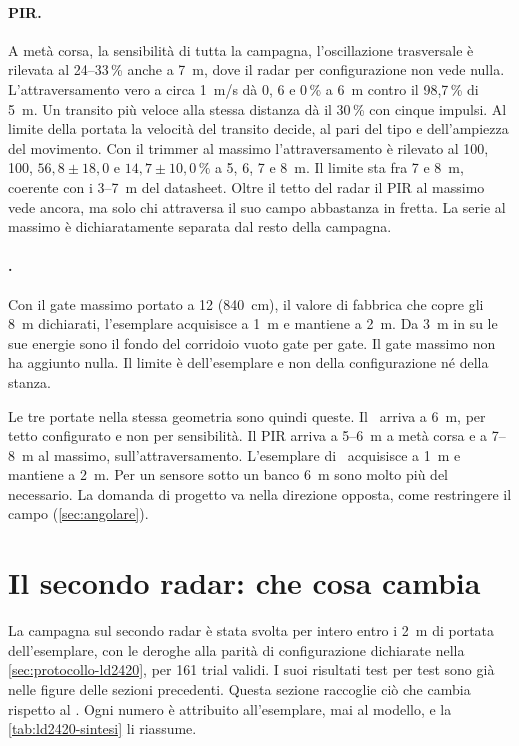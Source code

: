 \paragraph{PIR.} A metà corsa, la sensibilità di tutta la campagna, l'oscillazione
trasversale è rilevata al 24--33\,\% anche a 7~m, dove il radar per configurazione non
vede nulla. L'attraversamento vero a circa 1~m/s dà 0, 6 e 0\,\% a 6~m contro il
98,7\,\% di 5~m. Un transito più veloce alla stessa distanza dà il 30\,\% con cinque
impulsi. Al limite della portata la velocità del transito decide, al pari del tipo e
dell'ampiezza del movimento. Con il trimmer al massimo l'attraversamento è rilevato al
100, 100, $56{,}8 \pm 18{,}0$ e $14{,}7 \pm 10{,}0\,\%$ a 5, 6, 7 e 8~m. Il limite sta
fra 7 e 8~m, coerente con i 3--7~m del datasheet. Oltre il tetto del radar il PIR al
massimo vede ancora, ma solo chi attraversa il suo campo abbastanza in fretta. La
serie al massimo è dichiaratamente separata dal resto della campagna.

\paragraph{\ldc.} Con il gate massimo portato a 12 (840~cm), il valore di fabbrica
che copre gli 8~m dichiarati, l'esemplare acquisisce a 1~m e mantiene a 2~m. Da 3~m in
su le sue energie sono il fondo del corridoio vuoto gate per gate. Il gate massimo non
ha aggiunto nulla. Il limite è dell'esemplare e non della configurazione né della
stanza.

Le tre portate nella stessa geometria sono quindi queste. Il \ldb\ arriva a 6~m, per
tetto configurato e non per sensibilità. Il PIR arriva a 5--6~m a metà corsa e a 7--8~m
al massimo, sull'attraversamento. L'esemplare di \ldc\ acquisisce a 1~m e mantiene a
2~m. Per un sensore sotto un banco 6~m sono molto più del necessario. La domanda di
progetto va nella direzione opposta, come restringere il campo (\cref{sec:angolare}).

\section{Il secondo radar: che cosa cambia}
\label{sec:ld2420-risultati}
\label{sec:ld2420-taratura}
\label{sec:ld2420-fp}
\label{sec:ld2420-uprise}
\label{sec:ld2420-limiti}
\label{sec:ld2420-latenze}
\label{sec:ld2420-angolare}

La campagna sul secondo radar è stata svolta per intero entro i 2~m di portata
dell'esemplare, con le deroghe alla parità di configurazione dichiarate nella
\cref{sec:protocollo-ld2420}, per 161 trial validi. I suoi risultati test per test
sono già nelle figure delle sezioni precedenti. Questa sezione raccoglie ciò che
cambia rispetto al \ldb. Ogni numero è attribuito all'esemplare, mai al modello, e la
\cref{tab:ld2420-sintesi} li riassume.

